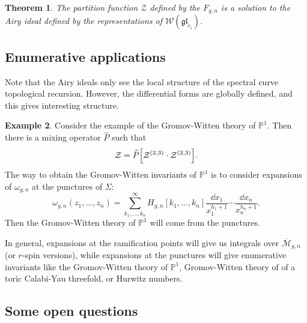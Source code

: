 \documentclass[leqno, openany]{memoir}
\newtheorem{thm}{Theorem}[section]
\theoremstyle{definition}
\newtheorem{exm}[thm]{Example}
\theoremstyle{remark}
\theoremstyle{plain}
\theoremstyle{definition}
\theoremstyle{remark}
\renewcommand{\P}{\mathbb{P}}
\newcommand{\mc}[1]{\mathcal{#1}}
\newcommand{\mf}[1]{\mathfrak{#1}}
\newcommand{\ol}[1]{\overline{#1}}
\newcommand{\wh}[1]{\widehat{#1}}
\begin{document}
\begin{thm}
    The partition function $\mc{Z}$ defined by the $F_{g,n}$ is a solution to the Airy ideal defined by the representations of $\mc{W}(\mf{gl}_{r_i})$.
\end{thm}

\subsection{Enumerative applications}

Note that the Airy ideals only see the local structure of the spectral curve topological recursion. However, the differential forms are globally defined, and this gives interesting structure.

\begin{exm}
    Consider the example of the Gromov-Witten theory of $\P^1$. Then there is a mixing operator $\wh{P}$ such that
    \[ \mc{Z} = \wh{P} \qty[\mc{Z}^{(2,3)} \cdot \mc{Z}^{(2,3)}]. \]
    The way to obtain the Gromov-Witten invariants of $\P^1$ is to consider expansions of $\omega_{g, n}$ at the punctures of $\Sigma$:
    \[ \omega_{g, n}(z_1, \ldots, z_n) = \sum_{k_1, \ldots, k_n}^{\infty}H_{g,n}[k_1, \ldots, k_n] \frac{\dd{x_1}}{x_1^{h_1+1}} \cdots \frac{\dd{x_n}}{x_n^{h_n+1}}. \]
    Then the Gromov-Witten theory of $\P^1$ will come from the punctures.
\end{exm}

In general, expansions at the ramification points will give us integrals over $\ol{\mc{M}}_{g, n}$ (or $r$-spin versions), while expansions at the punctures will give enumerative invariants like the Gromov-Witten theory of $\P^1$, Gromov-Witten theory of of a toric Calabi-Yau threefold, or Hurwitz numbers.

\subsection{Some open questions}
\end{document}
